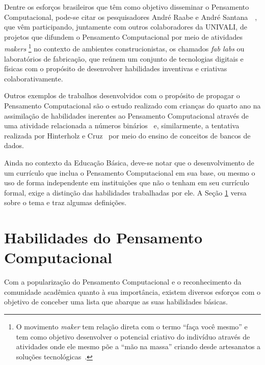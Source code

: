 Dentre os esforços brasileiros que têm como objetivo disseminar o Pensamento Computacional, pode-se citar os pesquisadores André Raabe e André Santana~\cite{santana_atividades_2016}~\cite{santana_lite_2016}, que vêm participando, juntamente com outros colaboradores da \acrshort{UNIVALI}, de projetos que difundem o Pensamento Computacional por meio de atividades \textit{makers} \footnote{O movimento \textit{maker} tem relação direta com o termo “faça você mesmo” e tem como objetivo desenvolver o potencial criativo do indivíduo através de atividades onde ele mesmo põe a “mão na massa” criando desde artesanatos a soluções tecnológicas~\cite{tanji_makers:_2017}.} no contexto de ambientes construcionistas, os chamados \textit{fab labs} ou laboratórios de fabricação, que reúnem um conjunto de tecnologias digitais e físicas com o propósito de desenvolver habilidades inventivas e criativas colaborativamente.

Outros exemplos de trabalhos desenvolvidos com o propósito de propagar o Pensamento Computacional são o estudo realizado com crianças do quarto ano na assimilação de habilidades inerentes ao Pensamento Computacional através de uma atividade relacionada a números binários~\cite{campos_organizacao_2014} e, similarmente, a tentativa realizada por Hinterholz e Cruz~\cite{hinterholz_desenvolvimento_2015} por meio do ensino de conceitos de bancos de dados. 

Ainda no contexto da Educação Básica, deve-se notar que o desenvolvimento de um currículo que inclua o Pensamento Computacional em sua base, ou mesmo o uso de forma independente em instituições que não o tenham em seu currículo formal, exige a distinção das habilidades trabalhadas por ele. A Seção \ref{sec:habilidades} versa sobre o tema e traz algumas definições.

\section{Habilidades do Pensamento Computacional}\label{sec:habilidades}

Com a popularização do Pensamento Computacional e o reconhecimento da comunidade acadêmica quanto à sua importância, existem diversos esforços com o objetivo de conceber uma lista que abarque as suas habilidades básicas. 

